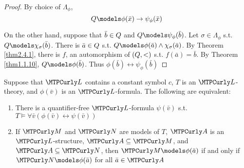\documentclass[11pt]{article}
\begin{document}
\begin{proof}
By choice of \(\Lambda_\phi\),
\begin{equation*}
\Q\models\phi(\bar{x})\to\psi_\phi(\bar{x})
\end{equation*}

On the other hand, suppose that \(\bar{b}\in\relax{Q}\) and
\(\Q\models\psi_\phi(\bar{b})\). Let \(\sigma\in\Lambda_\phi\) s.t. \(\Q\models\chi_\sigma(\bar{b})\).
There is \(\bar{a}\in\relax{Q}\) s.t. \(\Q\models\phi(\bar{a})\wedge\chi_\sigma(\bar{a})\). By Theorem
\ref{thm2.4.1}, there is \(f\), an automorphism of \((\relax{Q},<)\) s.t.
\(f(\bar{a})=\bar{b}\). By Theorem \ref{thm1.1.10}, \(\Q\models\phi(\bar{b})\).
Thus \(\phi(\bar{b})\leftrightarrow\psi_\phi(\bar{b})\)
\end{proof}

\begin{theorem}[]
\label{thm3.1.4}
Suppose that \(\call\) contains a constant symbol \(c\), \(T\) is an
\(\call\)-theory, and \(\phi(\bar{v})\) is an \(\call\)-formula. The following
are equivalent:
\begin{enumerate}
\item There is a quantifier-free \(\call\)-formula \(\psi(\bar{v})\) s.t.
\(T\models\forall\bar{v}(\phi(\bar{v})\leftrightarrow\psi(\bar{v}))\)
\item If \(\calm\) and \(\caln\) are models of \(T\), \(\cala\) is an
\(\call\)-structure, \(\cala\subseteq\calm\), and \(\cala\subseteq\caln\),
then \(\calm\models\phi(\bar{a})\) if and only if \(\caln\models\phi(\bar{a})\)
for all \(\bar{a}\in\cala\)
\end{enumerate}
\end{theorem}
\end{document}
